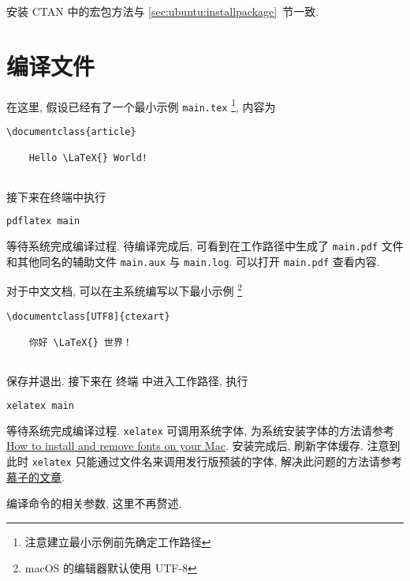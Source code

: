 安装 CTAN 中的宏包方法与 \ref{sec:ubuntu:installpackage}~节一致.

\section{编译文件}

在这里, 假设已经有了一个最小示例 \texttt{main.tex}%
\footnote{注意建立最小示例前先确定工作路径},
内容为
\begin{lstlisting}[language = {[LaTeX]TeX}]
  \documentclass{article}
  
    Hello \LaTeX{} World!
  
\end{lstlisting}
接下来在\textsf{终端}中执行
\begin{lstlisting}[language=bash]
  pdflatex main
\end{lstlisting}
等待系统完成编译过程. 
待编译完成后, 可看到在工作路径中生成了 \texttt{main.pdf}
文件和其他同名的辅助文件 \texttt{main.aux} 与 \texttt{main.log}.
可以打开 \texttt{main.pdf} 查看内容.

对于中文文档, 可以在主系统编写以下最小示例%
\footnote{macOS 的编辑器默认使用 UTF-8}%
\begin{lstlisting}[language={[LaTeX]TeX}]
  \documentclass[UTF8]{ctexart}
  
    你好 \LaTeX{} 世界！
  
\end{lstlisting}
保存并退出.
接下来在 \textsf{终端} 中进入工作路径,
执行
\begin{lstlisting}[language=bash]
  xelatex main
\end{lstlisting}
等待系统完成编译过程.
\texttt{xelatex} 可调用系统字体,
为系统安装字体的方法请参考
\href{https://support.apple.com/en-us/HT201749}{How to install and remove fonts on your Mac}.
安装完成后, 刷新字体缓存.
注意到此时 \texttt{xelatex} 只能通过文件名来调用发行版预装的字体,
解决此问题的方法请参考%
\href{https://zhuanlan.zhihu.com/p/59774395}{慕子的文章}.

编译命令的相关参数, 这里不再赘述.
